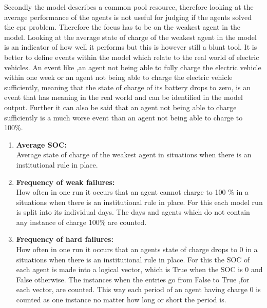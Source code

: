 \documentclass[a4paper]{article}
\begin{document}
Secondly the model describes a common pool resource, therefore looking at the average performance of the agents 
is not useful for judging if the agents solved the cpr problem. Therefore the focus has to be on the weakest agent 
in the model. Looking at the average state of charge of the weakest agent in the model is an indicator of 
how well it performs but this is however still a blunt tool. It is better to define events within the model which relate 
to the real world of electric vehicles. An event like ,an agent not being able to fully charge the electric vehicle 
within one week or an agent not being able to charge the electric vehicle sufficiently, 
meaning that the state of charge of its battery drops to zero, is an event that has meaning in the real world and can 
be identified in the model output. Further it can also be said that an agent not being able to charge sufficiently is a
much worse event than an agent not being able to charge to 100\%.
\begin{enumerate}
 \item \textbf{Average SOC:}\\
 Average state of charge of the weakest agent in situations when there is an institutional rule in place.
 \item \textbf{Frequency of weak failures:}\\
 How often in one run it occurs that 
 an agent cannot charge to 100 \% in a situations when there is an institutional rule in place. For this each model run 
 is split into its individual days. The days and agents which do not contain any instance of charge 100\% are counted.
 \item \textbf{Frequency of hard failures:}\\
 How often in one run it occurs that 
 an agents state of charge drops to 0 in a situations when there is an institutional rule in place. For this the SOC of each 
 agent is made into a logical vector, which is True when the SOC is 0 and False otherwise. The instances when the entries go from False
 to True ,for each vector, are counted. This way each period of an agent having charge 0 is counted as one instance no matter how long or 
 short the period is.
\end{enumerate}
\end{document}

